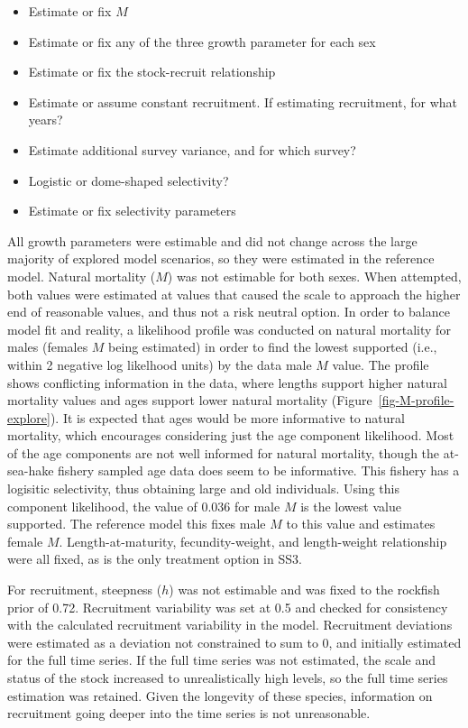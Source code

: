 \documentclass[
]{scrartcl}
\providecommand{\tightlist}{%
  \setlength{\itemsep}{0pt}\setlength{\parskip}{0pt}}\usepackage{longtable,booktabs,array}
\begin{document}
\begin{itemize}
\tightlist
\item
  Estimate or fix \(M\)
\item
  Estimate or fix any of the three growth parameter for each sex
\item
  Estimate or fix the stock-recruit relationship
\item
  Estimate or assume constant recruitment. If estimating recruitment,
  for what years?
\item
  Estimate additional survey variance, and for which survey?
\item
  Logistic or dome-shaped selectivity?
\item
  Estimate or fix selectivity parameters
\end{itemize}

All growth parameters were estimable and did not change across the large
majority of explored model scenarios, so they were estimated in the
reference model. Natural mortality (\(M\)) was not estimable for both
sexes. When attempted, both values were estimated at values that caused
the scale to approach the higher end of reasonable values, and thus not
a risk neutral option. In order to balance model fit and reality, a
likelihood profile was conducted on natural mortality for males (females
\(M\) being estimated) in order to find the lowest supported (i.e.,
within 2 negative log likelhood units) by the data male \(M\) value. The
profile shows conflicting information in the data, where lengths support
higher natural mortality values and ages support lower natural mortality
(Figure~\ref{fig-M-profile-explore}). It is expected that ages would be
more informative to natural mortality, which encourages considering just
the age component likelihood. Most of the age components are not well
informed for natural mortality, though the at-sea-hake fishery sampled
age data does seem to be informative. This fishery has a logisitic
selectivity, thus obtaining large and old individuals. Using this
component likelihood, the value of 0.036 for male \(M\) is the lowest
value supported. The reference model this fixes male \(M\) to this value
and estimates female \(M\). Length-at-maturity, fecundity-weight, and
length-weight relationship were all fixed, as is the only treatment
option in SS3.

For recruitment, steepness (\(h\)) was not estimable and was fixed to
the rockfish prior of 0.72. Recruitment variability was set at 0.5 and
checked for consistency with the calculated recruitment variability in
the model. Recruitment deviations were estimated as a deviation not
constrained to sum to 0, and initially estimated for the full time
series. If the full time series was not estimated, the scale and status
of the stock increased to unrealistically high levels, so the full time
series estimation was retained. Given the longevity of these species,
information on recruitment going deeper into the time series is not
unreasonable.
\end{document}
